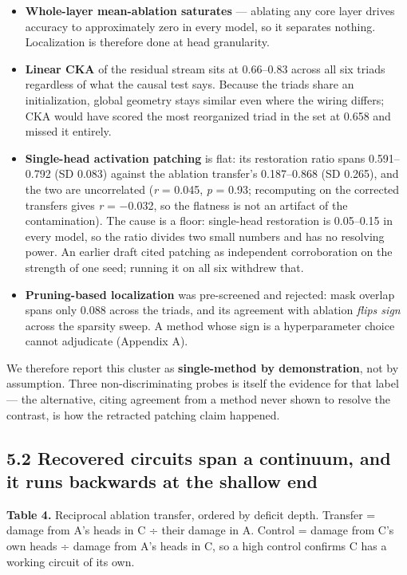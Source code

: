 \documentclass{article}
\providecommand{\tightlist}{\setlength{\itemsep}{0pt}\setlength{\parskip}{0pt}}
\begin{document}
\begin{itemize}
\tightlist
\item
  \textbf{Whole-layer mean-ablation saturates} --- ablating any core layer drives accuracy to
  approximately zero in every model, so it separates nothing. Localization is therefore done
  at head granularity.
\item
  \textbf{Linear CKA} of the residual stream sits at 0.66--0.83 across all six triads regardless of
  what the causal test says. Because the triads share an initialization, global geometry
  stays similar even where the wiring differs; CKA would have scored the most reorganized
  triad in the set at 0.658 and missed it entirely.
\item
  \textbf{Single-head activation patching} is flat: its restoration ratio spans 0.591--0.792
  (SD 0.083) against the ablation transfer's 0.187--0.868 (SD 0.265), and the two are
  uncorrelated (\emph{r} = 0.045, \emph{p} = 0.93; recomputing on the corrected transfers gives
  \emph{r} = −0.032, so the flatness is not an artifact of the contamination). The cause is a
  floor: single-head restoration is 0.05--0.15 in every model, so the ratio divides two small
  numbers and has no resolving power. An earlier draft cited patching as independent
  corroboration on the strength of one seed; running it on all six withdrew that.
\item
  \textbf{Pruning-based localization} was pre-screened and rejected: mask overlap spans only 0.088
  across the triads, and its agreement with ablation \emph{flips sign} across the sparsity sweep.
  A method whose sign is a hyperparameter choice cannot adjudicate (Appendix A).
\end{itemize}

We therefore report this cluster as \textbf{single-method by demonstration}, not by assumption.
Three non-discriminating probes is itself the evidence for that label --- the alternative,
citing agreement from a method never shown to resolve the contrast, is how the retracted
patching claim happened.

\subsection{5.2 Recovered circuits span a continuum, and it runs backwards at the shallow end}\label{recovered-circuits-span-a-continuum-and-it-runs-backwards-at-the-shallow-end}

\textbf{Table 4.} Reciprocal ablation transfer, ordered by deficit depth. Transfer = damage from
A's heads in C ÷ their damage in A. Control = damage from C's own heads ÷ damage from A's
heads in C, so a high control confirms C has a working circuit of its own.
\end{document}
